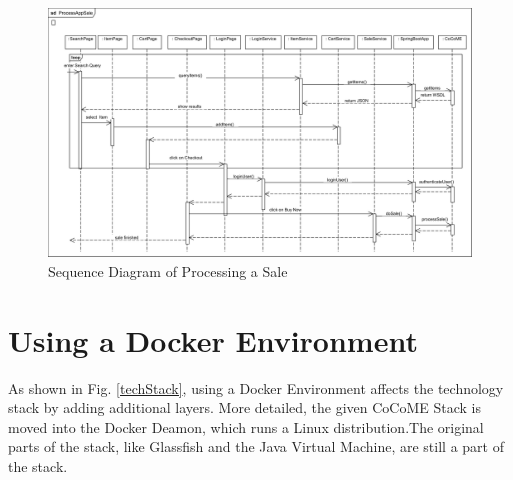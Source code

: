 \begin{figure}[!h]
	\includegraphics[width=\textwidth]{img/appProcessSale.png}
	\caption{Sequence Diagram of Processing a Sale}
	\label{SequenceAppSale}
\end{figure}

\newpage

\section{Using a Docker Environment} \label{Docker}

As shown in Fig. \ref{techStack}, using a Docker Environment affects the technology stack by adding additional layers. More detailed, the given CoCoME Stack is moved into the Docker Deamon, which runs a Linux distribution.The original parts of the stack, like Glassfish and the Java Virtual Machine, are still a part of the stack.
	
